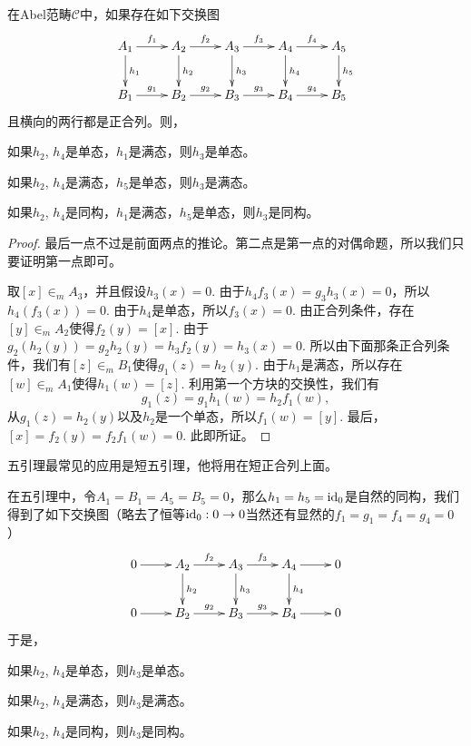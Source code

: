\begin{lem}[五引理]\label{5-lem}
在Abel范畴$\mathcal{C}$中，如果存在如下交换图
\[
	\xymatrix{
	A_1\ar[r]^{f_1}\ar[d]^{h_1}&A_2\ar[r]^{f_2}\ar[d]^{h_2}&A_3\ar[r]^{f_3}\ar[d]^{h_3}&A_4\ar[r]^{f_4}\ar[d]^{h_4}&A_5\ar[d]^{h_5}\\
	B_1\ar[r]^{g_1}&B_2\ar[r]^{g_2}&B_3\ar[r]^{g_3}&B_4\ar[r]^{g_4}&B_5\\
	}
\]
且横向的两行都是正合列。则，
\begin{compactenum}[~~~(1)]
\item 如果$h_2$, $h_4$是单态，$h_1$是满态，则$h_3$是单态。
\item 如果$h_2$, $h_4$是满态，$h_5$是单态，则$h_3$是满态。
\item 如果$h_2$, $h_4$是同构，$h_1$是满态，$h_5$是单态，则$h_3$是同构。
\end{compactenum}
\end{lem}

\begin{proof}
最后一点不过是前面两点的推论。第二点是第一点的对偶命题，所以我们只要证明第一点即可。

取$[x]\in_m A_3$，并且假设$h_3(x)=0$. 由于$h_4f_3(x)=g_3h_3(x)=0$，所以$h_4(f_3(x))=0$. 由于$h_4$是单态，所以$f_3(x)=0$. 由正合列条件，存在$[y]\in_m A_2$使得$f_2(y)=[x]$. 由于$g_2(h_2(y))=g_2h_2(y)=h_3f_2(y)=h_3(x)=0$. 所以由下面那条正合列条件，我们有$[z]\in_m B_1$使得$g_1(z)=h_2(y)$. 由于$h_1$是满态，所以存在$[w]\in_m A_1$使得$h_1(w)=[z]$. 利用第一个方块的交换性，我们有
\[
	g_1(z)=g_1h_1(w)=h_2f_1(w),
\]
从$g_1(z)=h_2(y)$以及$h_2$是一个单态，所以$f_1(w)=[y]$. 最后，$[x]=f_2(y)=f_2f_1(w)=0$. 此即所证。
\end{proof}

五引理最常见的应用是短五引理，他将用在短正合列上面。

\begin{lem}[短五引理]\label{short-5-lem}
在五引理中，令$A_1=B_1=A_5=B_5=0$，那么$h_1=h_5=\operatorname{id}_0$是自然的同构，我们得到了如下交换图（略去了恒等$\operatorname{id}_0:0\to 0$当然还有显然的$f_1=g_1=f_4=g_4=0$）
\[
	\xymatrix{
	0\ar[r]&A_2\ar[r]^{f_2}\ar[d]^{h_2}&A_3\ar[r]^{f_3}\ar[d]^{h_3}&A_4\ar[r]\ar[d]^{h_4}&0\\
	0\ar[r]&B_2\ar[r]^{g_2}&B_3\ar[r]^{g_3}&B_4\ar[r]&0\\
	}
\]
于是，
\begin{compactenum}[~~~(1)]
\item 如果$h_2$, $h_4$是单态，则$h_3$是单态。
\item 如果$h_2$, $h_4$是满态，则$h_3$是满态。
\item 如果$h_2$, $h_4$是同构，则$h_3$是同构。
\end{compactenum}
\end{lem}

